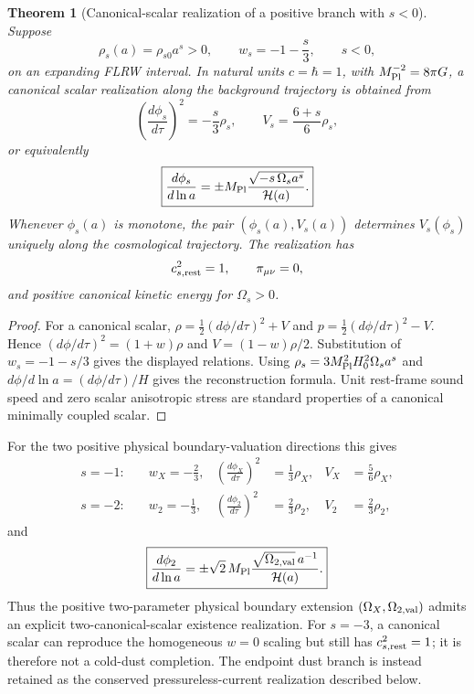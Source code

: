 \documentclass[11pt,a4paper]{article}
\def\dd{d}%
\numberwithin{equation}{section}
\theoremstyle{definition}
\theoremstyle{plain}
\newtheorem{theorem}[criterion]{Theorem}
\theoremstyle{remark}
\newcommand{\dd}{\mathrm{d}}
\begin{document}
\begin{theorem}[Canonical-scalar realization of a positive branch with \(s<0\)]
Suppose
\begin{equation}
\rho_s(a)=\rho_{s0}a^s>0,
\qquad
w_s=-1-\frac{s}{3},
\qquad
s<0,
\end{equation}
on an expanding FLRW interval. In natural units \(c=\hbar=1\), with \(M_{\rm Pl}^{-2}=8\pi G\), a canonical scalar realization along the background trajectory is obtained from
\begin{equation}
\boxed{
\left(\frac{\dd\phi_s}{\dd\tau}\right)^2
=-\frac{s}{3}\rho_s,
\qquad
V_s=\frac{6+s}{6}\rho_s,
}
\end{equation}
or equivalently
\begin{equation}
\boxed{
\frac{\dd\phi_s}{\dd\ln a}
=\pm M_{\rm Pl}
\frac{\sqrt{-s\,\Omega_s a^s}}{\mathcal H(a)}.
}
\end{equation}
Whenever \(\phi_s(a)\) is monotone, the pair \((\phi_s(a),V_s(a))\) determines \(V_s(\phi_s)\) uniquely along the cosmological trajectory. The realization has
\begin{equation}
c_{s,\rm rest}^2=1,
\qquad
\pi_{\mu\nu}=0,
\end{equation}
and positive canonical kinetic energy for \(\Omega_s>0\).
\end{theorem}
\begin{proof}
For a canonical scalar,
\(\rho=\tfrac12(\dd\phi/\dd\tau)^2+V\) and
\(p=\tfrac12(\dd\phi/\dd\tau)^2-V\). Hence
\((\dd\phi/\dd\tau)^2=(1+w)\rho\) and \(V=(1-w)\rho/2\). Substitution of \(w_s=-1-s/3\) gives the displayed relations. Using \(\rho_s=3M_{\rm Pl}^2H_0^2\Omega_s a^s\) and
\(\dd\phi/\dd\ln a=(\dd\phi/\dd\tau)/H\) gives the reconstruction formula. Unit rest-frame sound speed and zero scalar anisotropic stress are standard properties of a canonical minimally coupled scalar.
\end{proof}

For the two positive physical boundary-valuation directions this gives
\begin{align}
s=-1:\quad &w_X=-\frac23,
&\left(\frac{\dd\phi_X}{\dd\tau}\right)^2&=\frac13\rho_X,
&V_X&=\frac56\rho_X,
\\
s=-2:\quad &w_2=-\frac13,
&\left(\frac{\dd\phi_2}{\dd\tau}\right)^2&=\frac23\rho_2,
&V_2&=\frac23\rho_2,
\end{align}
and
\begin{equation}
\boxed{
\frac{\dd\phi_2}{\dd\ln a}
=\pm\sqrt2\,M_{\rm Pl}
\frac{\sqrt{\Omega_{2,\rm val}}\,a^{-1}}{\mathcal H(a)}.
}
\end{equation}
Thus the positive two-parameter physical boundary extension \((\Omega_X,\Omega_{2,\rm val})\) admits an explicit two-canonical-scalar existence realization. For \(s=-3\), a canonical scalar can reproduce the homogeneous \(w=0\) scaling but still has \(c_{s,\rm rest}^2=1\); it is therefore not a cold-dust completion. The endpoint dust branch is instead retained as the conserved pressureless-current realization described below.
\end{document}
